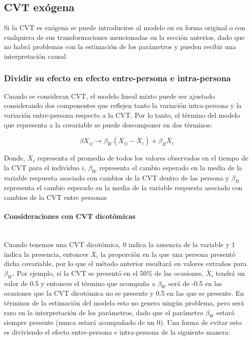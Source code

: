 \documentclass[spanish]{article}
\numberwithin{figure}{subsection}
\numberwithin{equation}{subsection}
\numberwithin{table}{subsection}
\begin{document}
\subsection{CVT exógena}

Si la CVT es exógena se puede introducirse al modelo en su forma original o con
cualquiera de sus transformaciones mencionadas en la sección anterios, dado que
no habrá problemas con la estimación de los parámetros y pueden recibir una
interpretación causal

\subsubsection{Dividir su efecto en efecto entre-persona e intra-persona}

Cuando se consideran CVT, el modelo lineal mixto puede ser ajustado considerando
dos componentes que reflejen tanto la variación intra-persona y la variación
entre-persona respecto a la CVT. Por lo tanto, el término del modelo que
representa a la covariable se puede descomponer en dos términos:

\[
	\beta X_{ij} \rightarrow \beta_W (X_{ij} - \overline{X}_i)
	+ \beta_B \overline{X}_i
\]

Donde, $\overline{X}_i$ representa el promedio de todos los valores observados
en el tiempo de la CVT para el individuo $i$, $\beta_W$ representa el cambio
esperado en la media de la variable respuesta asociado con cambios de la CVT
dentro de las persona y $\beta_B$ representa el cambio esperado en la media de
la variable respuesta asociado con cambios de la CVT entre personas

\paragraph{Consideraciones con CVT dicotómicas} \mbox{} \\

Cuando tenemos una CVT dicotómica, 0 indica la ausencia de la variable y 1
indica la presencia, entonces $\overline{X}_i$ la proporción en la que una
persona presentó dicha covariable, por lo que el método anterior resultará en
valores extraños para $\beta_W$. Por ejemplo, si la CVT se presentó en el 50\%
de las ocasiones, $\overline{X}_i$ tendrá un valor de 0.5 y entonces el término
que acompaña a $\beta_W$ será de -0.5 en las ocasiones que la CVT dicotómica no
se presente y 0.5 en las que se presente. En términos de la estimación del
modelo esto no genera ningún problema, pero será raro en la interpretación de
los parámetros, dado que el parámetro $\beta_W$ estará siempre presente (nunca
estará acompañado de un 0). Una forma de evitar esto es diviviendo el efecto
entre-persona e intra-persona de la siguiente manera:
\end{document}
